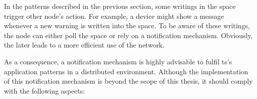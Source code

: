 In the patterns described in the previous section, some writings in the space trigger other node's action.
For example, a device might show a message whenever a new warning is written into the space. %
To be aware of these writings, the node can either poll the space or rely on a notification mechanism. %
Obviously, the later leads to a more efficient use of the network. %


As a consequence, a notification mechanism is highly advisable to fulfil \ac{ts}'s application patterns in a distributed environment.
Although the implementation of this notification mechanism is beyond the scope of this thesis,
it should comply with the following aspects:
